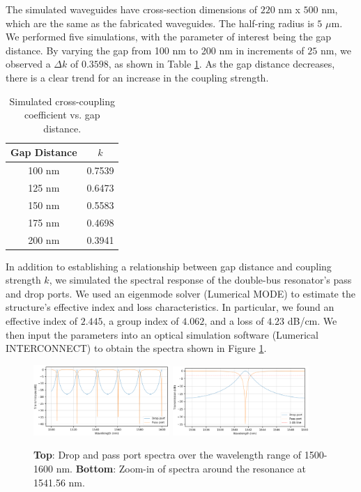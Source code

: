 \documentclass[letterpaper, 10 pt, conference]{ieeeconf}
\begin{document}
The simulated waveguides have cross-section dimensions of $220$ nm x $500$ nm, which are the same as the fabricated waveguides. The half-ring radius is $5$ $\mu$m. We performed five simulations, with the parameter of interest being the gap distance. By varying the gap from 100 nm to 200 nm in increments of $25$ nm, we observed a $\Delta k$ of $0.3598$, as shown in Table \ref{tab:sim}. As the gap distance decreases, there is a clear trend for an increase in the coupling strength. 

\begin{table}[!ht]
\centering
\caption{Simulated cross-coupling coefficient vs. gap distance.}
\begin{tabular}{|c|c|}
\hline
\textbf{Gap Distance} & \textbf{$k$} \\ \hline
100 nm & 0.7539 \\ \hline
125 nm & 0.6473 \\ \hline
150 nm & 0.5583 \\ \hline
175 nm & 0.4698 \\ \hline
200 nm & 0.3941 \\ \hline
\end{tabular}
\label{tab:sim}
\end{table}

In addition to establishing a relationship between gap distance and coupling strength $k$, we simulated the spectral response of the double-bus resonator's pass and drop ports. We used an eigenmode solver (Lumerical MODE) to estimate the structure's effective index and loss characteristics. In particular, we found an effective index of $2.445$, a group index of $4.062$, and a loss of $4.23$ dB/cm. We then input the parameters into an optical simulation software (Lumerical INTERCONNECT) to obtain the spectra shown in Figure \ref{fig:simfull}.

\begin{figure}[!ht]
    \centering
    \includegraphics[width = 0.46\textwidth]{sim_full.png}
    \includegraphics[width = 0.46\textwidth]{sim_zoom.png}
    \caption{\textbf{Top}: Drop and pass port spectra over the wavelength range of 1500-1600 nm. \textbf{Bottom}: Zoom-in of spectra around the resonance at 1541.56 nm.}
    \label{fig:simfull}
\end{figure} 
\end{document}

